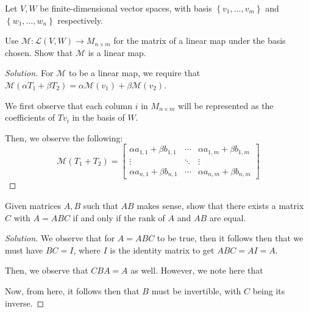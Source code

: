 \documentclass[openany]{book}
\newenvironment{solution}{\begin{proof}[Solution]}{\end{proof}}
\begin{document}
\begin{hw}
	Let $V, W$ be finite-dimensional vector spaces, with basis $\left\{  v_{1}, \ldots, v_{m}\right\}$ and $\left\{  w_{1}, \ldots, w_{n}\right\}$ respectively.
	
	Use $\mathcal M : \mathcal L(V,W) \rightarrow M_{n \times m}$ for the matrix of a linear map under the basis chosen. Show that $\mathcal M$ is a linear map.
\end{hw}
\begin{solution}
	For $\mathcal M$ to be a linear map, we require that $\mathcal M(\alpha T_{1} + \beta T_{2}) = \alpha\mathcal{M}(v_{1}) + \beta\mathcal M(v_{2})$.
	
	We first observe that each column $i$ in $M_{n \times m}$ will be represented as the coefficients of $Tv_{i}$ in the basis of $W$. 
	\begin{comment}
	So, for column $i$, we see:
	\begin{align*}
		[T_{1} + T_{2}]_{C}^{B} &= [T_{1}]_{C}^{B} + [T_{2}]_{C}^{B}
		
	\end{align*}
	\end{comment}
	
	Then, we observe the following:
	\begin{equation*}
		\mathcal M(T_{1} + T_{2}) =
			\begin{bmatrix}
				\alpha a_{1,1} + \beta b_{1,1} & \cdots & \alpha a_{1, m} + \beta b_{1, m} \\
				\vdots & \ddots & \vdots \\
			\alpha	a_{n, 1} + \beta b_{n,1} & \cdots & \alpha a_{n,m} + \beta b_{n,m}
			\end{bmatrix}
	\end{equation*}
\end{solution}

\begin{hw}
	Given matrices $A,B$ such that $AB$ makes sense, show that there exists a matrix $C$ with $A = ABC$ if and only if the rank of $A$ and $AB$ are equal.
\end{hw}
\begin{solution}
	We observe that for $A = ABC$ to be true, then it follows then that we must have $BC = I$, where $I$ is the identity matrix to get $ABC = AI = A$.
	
	Then, we observe that $CBA = A$ as well. However, we note here that 
	
	Now, from here, it follows then that $B$ must be invertible, with $C$ being its inverse.
\end{solution}
\end{document}
